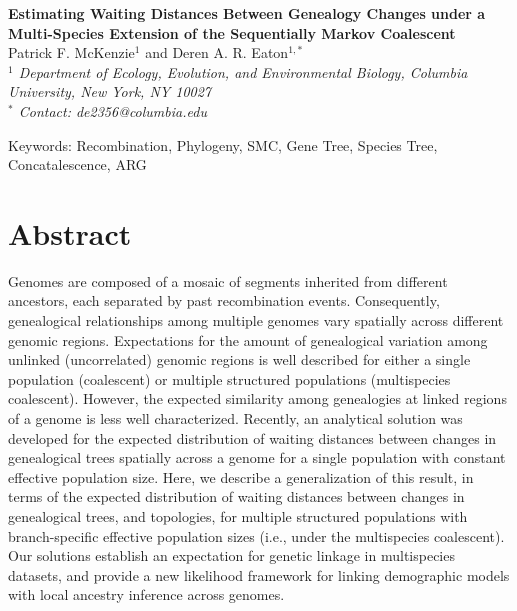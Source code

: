 \documentclass[11pt]{article}
\begin{document}
\begin{center}
	{\bf \Large
		Estimating Waiting Distances Between Genealogy Changes under a \\[0.25cm]
		Multi-Species Extension of the Sequentially Markov Coalescent
	}\\[0.5cm]

	Patrick F. McKenzie$^{1}$ and Deren A. R. Eaton$^{1, *}$\\[0.25cm]

	\emph{
	$^{1}$ Department of Ecology, Evolution, and Environmental Biology, Columbia University, New York, NY 10027\\[0.5cm]
	$^{*}$ Contact: de2356@columbia.edu\\[0.5cm]
	}
\end{center}

Keywords: Recombination, Phylogeny, SMC, Gene Tree, Species Tree, Concatalescence, ARG

\RaggedRight

\section*{Abstract}
Genomes are composed of a mosaic of segments inherited from different ancestors, 
each separated by past recombination events. Consequently, genealogical
relationships among multiple genomes vary spatially across different genomic 
regions. Expectations for the amount of genealogical variation among unlinked 
(uncorrelated) genomic regions is well described for either a single 
population (coalescent) or multiple structured populations (multispecies coalescent).
However, the expected similarity among genealogies at linked regions of a 
genome is less well characterized. 
Recently, an analytical solution was developed for the expected 
distribution of waiting distances between changes in genealogical trees 
spatially across a genome for a single population with constant effective 
population size. Here, we describe a generalization of this 
result, in terms of the expected distribution of waiting distances between 
changes in genealogical trees, and topologies, for multiple structured populations
with branch-specific effective population sizes (i.e., under the multispecies 
coalescent). Our solutions establish an expectation for genetic linkage  
in multispecies datasets, and provide a new likelihood framework for linking
demographic models with local ancestry inference across genomes.
\end{document}
